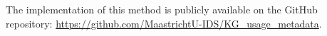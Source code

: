 \documentclass[sw]{iosart2x}
\providecommand{\DIFdelbegin}{} %
\providecommand{\DIFscaledelfig}{0.5}
\newlength{\DIFdelgraphicswidth} %
\newlength{\DIFdelgraphicsheight} %
\providecommand{\DIFdelincludegraphics}[2][]{%
\sbox{\DIFdelgraphicsbox}{\DIFOincludegraphics[#1]{#2}}%
\settoboxwidth{\DIFdelgraphicswidth}{\DIFdelgraphicsbox} %
\settoboxtotalheight{\DIFdelgraphicsheight}{\DIFdelgraphicsbox} %
\scalebox{\DIFscaledelfig}{%
\parbox[b]{\DIFdelgraphicswidth}{\usebox{\DIFdelgraphicsbox}\\[-\baselineskip] \rule{\DIFdelgraphicswidth}{0em}}\llap{\resizebox{\DIFdelgraphicswidth}{\DIFdelgraphicsheight}{%
\setlength{\unitlength}{\DIFdelgraphicswidth}%
\begin{picture}(1,1)%
\thicklines\linethickness{2pt} %
{\color[rgb]{1,0,0}\put(0,0){\framebox(1,1){}}}%
{\color[rgb]{1,0,0}\put(0,0){\line( 1,1){1}}}%
{\color[rgb]{1,0,0}\put(0,1){\line(1,-1){1}}}%
\end{picture}%
}\hspace*{3pt}}} %
} %
\DeclareRobustCommand{\DIFdelbegin}{\DIFOdelbegin \let\includegraphics\DIFdelincludegraphics} %
\begin{document}
The implementation of this method is publicly available on the GitHub repository: \url{https://github.com/MaastrichtU-IDS/KG_usage_metadata}.
\DIFdelbegin %

\end{document}
